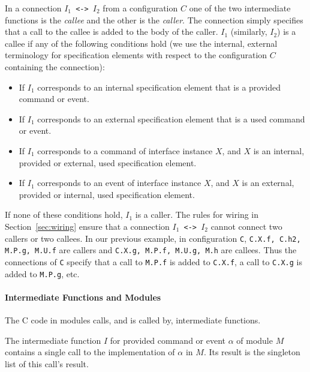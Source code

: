 \documentclass[11pt]{article}
\newcommand{\code}[1]{{\tt #1}}
\begin{document}
In a connection \code{$I_1$ <-> $I_2$} from a configuration
$C$ one of the two intermediate functions is the \emph{callee} and the
other is the \emph{caller}. The connection simply specifies that a call to
the callee is added to the body of the caller. \code{$I_1$}
(similarly, \code{$I_2$}) is a callee if any of the following conditions hold
(we use the internal, external terminology for specification elements with
respect to the configuration $C$ containing the connection):
\begin{itemize}
\item If \code{$I_1$} corresponds to an internal specification element that
is a provided command or event.
\item If \code{$I_1$} corresponds to an external specification element that
is a used command or event.
\item If \code{$I_1$} corresponds to a command of interface instance $X$,
and $X$ is an internal, provided or external, used specification element.
\item If \code{$I_1$} corresponds to an event of interface instance $X$,
and $X$ is an external, provided or internal, used specification element.
\end{itemize}
If none of these conditions hold, \code{$I_1$} is a caller. The rules for
wiring in Section~\ref{sec:wiring} ensure that a connection \code{$I_1$ <->
$I_2$} cannot connect two callers or two callees. In our previous example,
in configuration \code{C}, \code{C.X.f, C.h2, M.P.g, M.U.f} are callers
and \code{C.X.g, M.P.f, M.U.g, M.h} are callees. Thus the connections of
\code{C} specify that a call to \code{M.P.f} is added to \code{C.X.f}, a
call to \code{C.X.g} is added to \code{M.P.g}, etc.


\paragraph{Intermediate Functions and Modules}

The C code in modules calls, and is called by, intermediate functions. 

The intermediate function $I$ for provided command or event $\alpha$ of
module $M$ contains a single call to the implementation of $\alpha$ in
$M$. Its result is the singleton list of this call's result.
\end{document}
